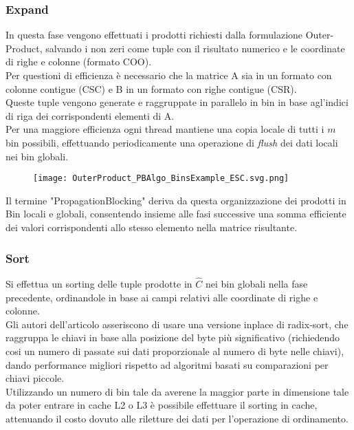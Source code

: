 \subsubsection{Expand}
In questa fase vengono effettuati i prodotti richiesti dalla formulazione Outer-Product, 
salvando i non zeri come tuple con il risultato numerico e le coordinate di righe e colonne (formato COO).\\
Per questioni di efficienza è necessario che la matrice A sia in un formato con colonne contigue (CSC) 
e B in un formato con righe contigue (CSR).\\
Queste tuple vengono generate e raggruppate in parallelo in bin in base agl'indici di riga dei corrispondenti elementi di A.\\
Per una maggiore efficienza ogni thread mantiene una copia locale di tutti i $m$ bin possibili, 
effettuando periodicamente una operazione di \emph{flush} dei dati locali nei bin globali.\\ 

\begin{figure}[h!]
  \centering \texttt{[image: OuterProduct\_PBAlgo\_BinsExample\_ESC.svg.png]}
  \caption[Rappresentazione grafica delle operazioni di flush periodiche dei bin locali ai thread nei bin globali]
  \decoRule \label{fig:OuterProduct_PBAlgo_BinsExample_ESC.svg.png}
\end{figure}

Il termine "PropagationBlocking" deriva da questa organizzazione dei prodotti in Bin locali e globali, 
consentendo insieme alle fasi successive una somma efficiente dei valori 
corrispondenti allo stesso elemento \nnz nella matrice risultante.\\

\subsubsection{Sort}
Si effettua un sorting delle tuple prodotte in $\hat{C}$ nei bin globali nella fase precedente,
ordinandole in base ai campi relativi alle coordinate di righe e colonne.\\
Gli autori dell'articolo asseriscono di usare una versione inplace di radix-sort, 
che raggruppa le chiavi in base alla posizione del byte più significativo 
(richiedendo cosi un numero di passate sui dati proporzionale al numero di byte nelle chiavi),
dando performance migliori rispetto ad algoritmi basati su comparazioni per chiavi piccole.\\
Utilizzando un numero di bin tale da averene la maggior parte in dimensione tale 
da poter entrare in cache L2 o L3 è possibile effettuare il sorting in cache, 
attenuando il costo dovuto alle riletture dei dati per l'operazione di ordinamento.


